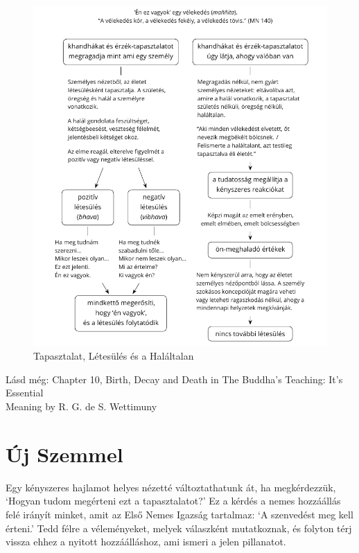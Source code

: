 \begin{figure}[h]
\caption{Tapasztalat, Létesülés és a Haláltalan}\label{fig-experience-becoming-deathless}
\bigskip
\includegraphics[width=\linewidth]{./manuscript/tex/diagrams/experience-becoming-deathless-hu.pdf}
\end{figure}

{\noindent\footnotesize
Lásd még: Chapter 10, Birth, Decay and Death in The Buddha's Teaching: It's Essential\\ Meaning by R. G. de S. Wettimuny
\par}


\clearpage
\normalpagelayout

\section{Új Szemmel}


\noindent Egy kényszeres hajlamot helyes nézetté változtathatunk át, ha
megkérdezzük, `Hogyan tudom megérteni ezt a tapasztalatot?' Ez a kérdés
a nemes hozzáállás felé irányít minket, amit az Első Nemes Igazság
tartalmaz: `A szenvedést meg kell érteni.' Tedd félre a véleményeket,
melyek válaszként mutatkoznak, és folyton térj vissza ehhez a nyitott
hozzáálláshoz, ami ismeri a jelen pillanatot.

